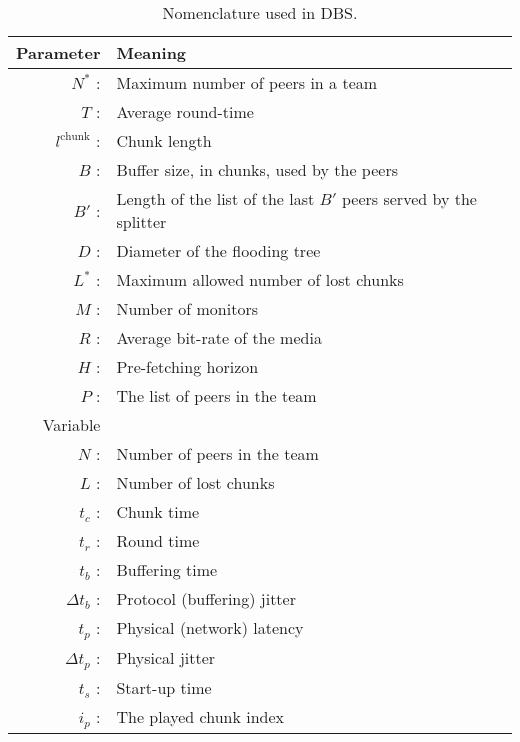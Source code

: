 \begin{table}[t]
  \centering
  \begin{tabular}{rl}
    Parameter & Meaning \\
    \hline
    $N^*$ :  & Maximum number of peers in a team \\
    $T$ :    & Average round-time \\
    $l^{\mathrm{chunk}}$ : & Chunk length \\
    $B$ :    & Buffer size, in chunks, used by the peers \\
    $B'$ :   & Length of the list of the last $B'$ peers served by the splitter \\ 
    $D$ :    & Diameter of the flooding tree \\
    $L^*$ :  & Maximum allowed number of lost chunks \\
    $M$ :    & Number of monitors \\
    $R$ :    & Average bit-rate of the media \\
    $H$ :    & Pre-fetching horizon \\
    $P$ :    & The list of peers in the team \\
    Variable & \\
    \hline
    $N$ :    & Number of peers in the team \\
    $L$ :    & Number of lost chunks \\
    $t_c$ :  & Chunk time \\
    $t_r$ :  & Round time \\
    $t_b$ :  & Buffering time \\
    $\Delta t_b$ : & Protocol (buffering) jitter \\ 
    $t_p$ :  & Physical (network) latency \\
    $\Delta t_p$ : & Physical jitter \\
    $t_s$ :  & Start-up time \\
    $i_p$ :  & The played chunk index 
  \end{tabular}
  \caption{Nomenclature used in DBS.} %
  \label{tab:DBS_nomenclature}
\end{table}
